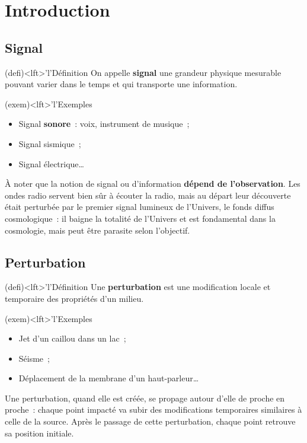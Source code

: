 \documentclass[../../main/main.tex]{subfiles}
\begin{document}
\vfill

\newpage

\vspace*{\fill}
\minitoc
\vspace*{\fill}

\newpage


\section{Introduction}
\subsection{Signal}
\begin{tcb}(defi)<lft>'l'{\tiny Définition}
	On appelle \textbf{signal} une grandeur physique mesurable pouvant varier
	dans le temps et qui transporte une information.
\end{tcb}
\begin{tcb}(exem)<lft>'l'{Exemples}
	\begin{itemize}
		\item Signal \textbf{sonore}~: voix, instrument de musique~;
		\item Signal sismique~;
		\item Signal électrique…
	\end{itemize}
\end{tcb}
À noter que la notion de signal ou d'information \textbf{dépend de
	l'observation}. Les ondes radio servent bien sûr à écouter la radio, mais au
départ leur découverte était perturbée par le premier signal lumineux de
l'Univers, le fonds diffus cosmologique~: il baigne la totalité de l'Univers et
est fondamental dans la cosmologie, mais peut être parasite selon l'objectif.

\subsection{Perturbation}

\begin{tcb}(defi)<lft>'l'{\tiny Définition}
	Une \textbf{perturbation} est une modification locale et temporaire des
	propriétés d'un milieu.
\end{tcb}
\begin{tcb}(exem)<lft>'l'{Exemples}
	\begin{itemize}
		\item Jet d'un caillou dans un lac~;
		\item Séisme~;
		\item Déplacement de la membrane d'un haut-parleur…
	\end{itemize}
\end{tcb}
Une perturbation, quand elle est créée, se propage autour d'elle de proche en
proche~: chaque point impacté va subir des modifications temporaires similaires
à celle de la source. Après le passage de cette perturbation, chaque point
retrouve sa position initiale.
\end{document}
